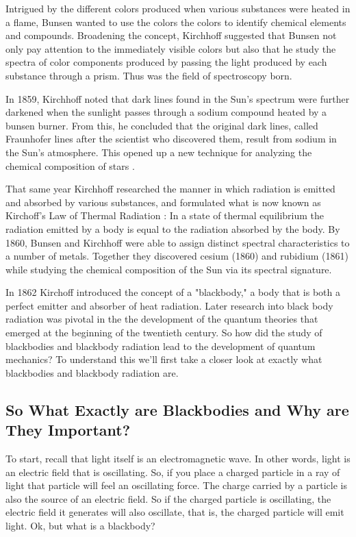 \documentclass{article}
\theoremstyle{definition}
\begin{document}
\bigskip
\noindent
Intrigued by the different colors produced when various
substances were heated in a flame, Bunsen wanted to use the
colors the colors to identify chemical elements and
compounds. Broadening the concept, Kirchhoff suggested that
Bunsen not only pay attention to the immediately visible colors
but also that he study the spectra of color components produced
by passing the light produced by each substance through a
prism. Thus was the field of spectroscopy born.

\bigskip
\noindent
In 1859, Kirchhoff noted that dark lines found in the Sun's
spectrum were further darkened when the sunlight passes through a
sodium compound heated by a bunsen burner. From this, he
concluded that the original dark lines, called Fraunhofer lines
after the scientist who discovered them, result from sodium in
the Sun's atmosphere. This opened up a new technique for
analyzing the chemical composition of stars
\cite{bunsen_and_kirchoff}.

\bigskip
\noindent
That same year Kirchhoff researched the manner in which radiation
is emitted and absorbed by various substances, and formulated
what is now known as Kirchoff's Law of Thermal Radiation
\cite{kirchoffs_law_of_thermal_radiation}: In a state of thermal
equilibrium the radiation emitted by a body is equal to the
radiation absorbed by the body. By 1860, Bunsen and Kirchhoff
were able to assign distinct spectral characteristics to a number
of metals. Together they discovered cesium (1860) and rubidium
(1861) while studying the chemical composition of the Sun via its
spectral signature.

\bigskip
\noindent
In 1862 Kirchoff introduced the concept of a "blackbody," a body
that is both a perfect emitter and absorber of heat
radiation. Later research into black body radiation was pivotal
in the the development of the quantum theories that emerged at
the beginning of the twentieth century. So how did the study of
blackbodies and blackbody radiation lead to the development of
quantum mechanics? To understand this we'll first take a closer
look at exactly what blackbodies and blackbody radiation are.

\subsection{So What Exactly are Blackbodies and Why are They Important?}
\label{subsec:black_bodies}
To start, recall that light itself is an electromagnetic wave.
In other words, light is an electric field that is oscillating.
So, if you place a charged particle in a ray of light that
particle will feel an oscillating force. The charge carried by a
particle is also the source of an electric field.  So if the
charged particle is oscillating, the electric field it generates
will also oscillate, that is, the charged particle will emit
light. Ok, but what is a blackbody?
\end{document}
